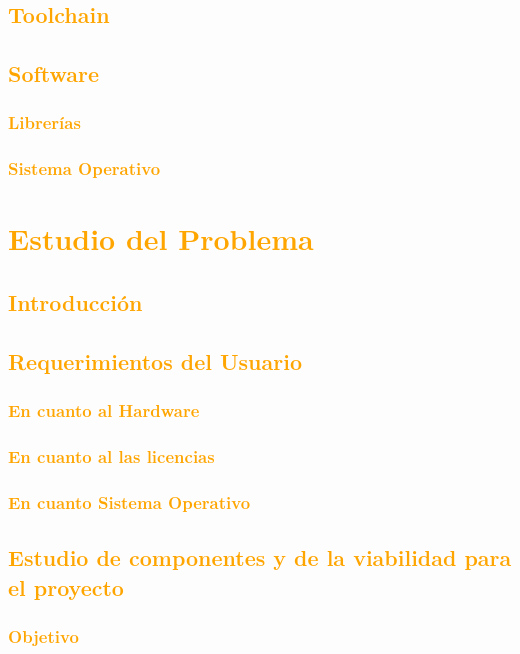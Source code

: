 \documentclass[a4paper,11pt]{article}
\begin{document}
		\subsection{\textcolor{orange}{Toolchain}}
		\subsection{\textcolor{orange}{Software}}
			\subsubsection{\textcolor{orange}{Librerías}}
			\subsubsection{\textcolor{orange}{Sistema Operativo}}
			
	
\section{\textcolor{orange}{Estudio del Problema}}
	\subsection{\textcolor{orange}{Introducción}}
	\subsection{\textcolor{orange}{Requerimientos del Usuario}}
			\subsubsection{\textcolor{orange}{En cuanto al Hardware}}
			\subsubsection{\textcolor{orange}{En cuanto al las licencias}} 
			\subsubsection{\textcolor{orange}{En cuanto Sistema Operativo}} 	 
				 		\subsection{\textcolor{orange}{Estudio de componentes y de la viabilidad para el proyecto}}	
		\subsubsection{\textcolor{orange}{Objetivo}} 	 
\end{document}
